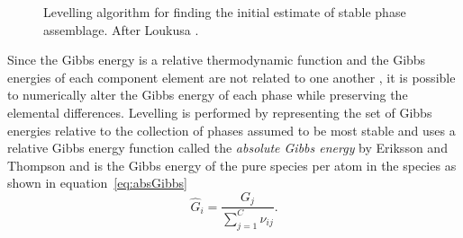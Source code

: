 \begin{figure}[ht!]
  		\caption[Levelling algorithm for finding the initial estimate of stable phase assemblage.]{Levelling algorithm for finding the initial estimate of stable phase assemblage. After Loukusa \cite{Loukusa:2014aa}.}
  		\label{fig:levelling}
 	\end{figure}

	Since the Gibbs energy is a relative thermodynamic function and the Gibbs energies of each component element are not related to one another \cite{Eriksson89}, it is possible to numerically alter the Gibbs energy of each phase while preserving the elemental differences. Levelling is performed by representing the set of Gibbs energies relative to the collection of phases assumed to be most stable and uses a relative Gibbs energy function called the \textit{absolute Gibbs energy} by Eriksson and Thompson and is the Gibbs energy of the pure species per atom in the species as shown in equation~\eqref{eq:absGibbs}
	\begin{equation}\label{eq:absGibbs}
		\hat{G}_i = \frac{G_j}{\sum_{j=1}^C \nu_{ij}}.
	\end{equation}

